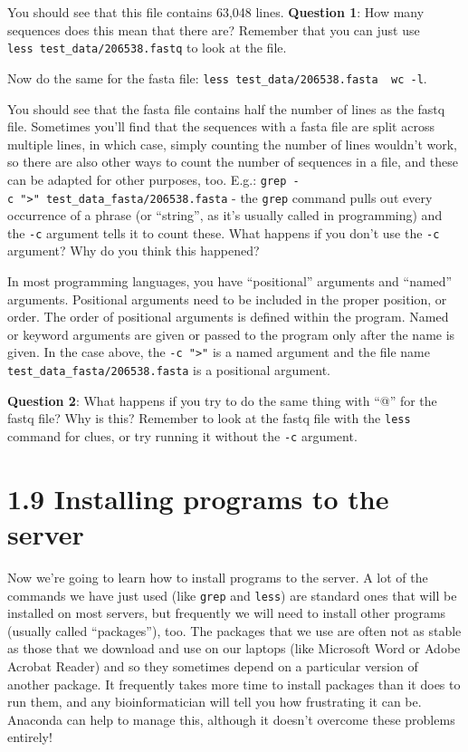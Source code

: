 \documentclass[
]{book}
\begin{document}
You should see that this file contains 63,048 lines.
\textbf{Question 1}: How many sequences does this mean that there are? Remember that you can just use \texttt{less\ test\_data/206538.fastq} to look at the file.

Now do the same for the fasta file: \texttt{less\ test\_data/206538.fasta\ \textbar{}\ wc\ -l}.

You should see that the fasta file contains half the number of lines as the fastq file. Sometimes you'll find that the sequences with a fasta file are split across multiple lines, in which case, simply counting the number of lines wouldn't work, so there are also other ways to count the number of sequences in a file, and these can be adapted for other purposes, too. E.g.: \texttt{grep\ -c\ "\textgreater{}"\ test\_data\_fasta/206538.fasta} - the \texttt{grep} command pulls out every occurrence of a phrase (or ``string'', as it's usually called in programming) and the \texttt{-c} argument tells it to count these. What happens if you don't use the \texttt{-c} argument? Why do you think this happened?

In most programming languages, you have ``positional'' arguments and ``named'' arguments. Positional arguments need to be included in the proper position, or order. The order of positional arguments is defined within the program. Named or keyword arguments are given or passed to the program only after the name is given. In the case above, the \texttt{-c\ "\textgreater{}"} is a named argument and the file name \texttt{test\_data\_fasta/206538.fasta} is a positional argument.

\textbf{Question 2}: What happens if you try to do the same thing with ``@'' for the fastq file? Why is this? Remember to look at the fastq file with the \texttt{less} command for clues, or try running it without the \texttt{-c} argument.

\section{1.9 Installing programs to the server}\label{installing-programs-to-the-server}

Now we're going to learn how to install programs to the server. A lot of the commands we have just used (like \texttt{grep} and \texttt{less}) are standard ones that will be installed on most servers, but frequently we will need to install other programs (usually called ``packages''), too. The packages that we use are often not as stable as those that we download and use on our laptops (like Microsoft Word or Adobe Acrobat Reader) and so they sometimes depend on a particular version of another package. It frequently takes more time to install packages than it does to run them, and any bioinformatician will tell you how frustrating it can be. Anaconda can help to manage this, although it doesn't overcome these problems entirely!
\end{document}
